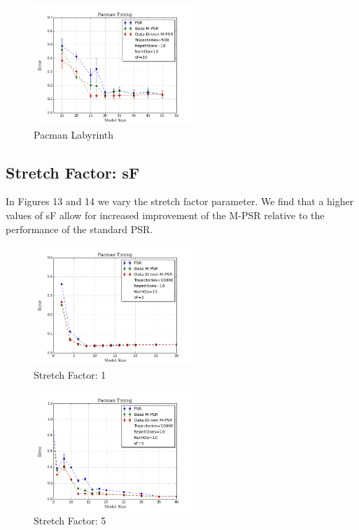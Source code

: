 \begin{figure}[ht!]
\centering
\includegraphics[width=60mm]{uCOREPICS/Pacman/Pacman500.png}
\caption{Pacman Labyrinth\label{overflow}}
\end{figure}

\subsection{Stretch Factor: sF}

In Figures 13 and 14 we vary the stretch factor parameter. We find that a higher values of sF allow for increased improvement of the M-PSR relative to the performance of the standard PSR.

\begin{figure}[ht!]
\centering
\includegraphics[width=60mm]{uCOREPICS/Pacman/PacmanSF=1.png}
\caption{Stretch Factor: 1\label{overflow}}
\end{figure}

\begin{figure}[ht!]
\centering
\includegraphics[width=60mm]{uCOREPICS/Pacman/PacmanSF=5.png}
\caption{Stretch Factor: 5\label{overflow}}
\end{figure}

